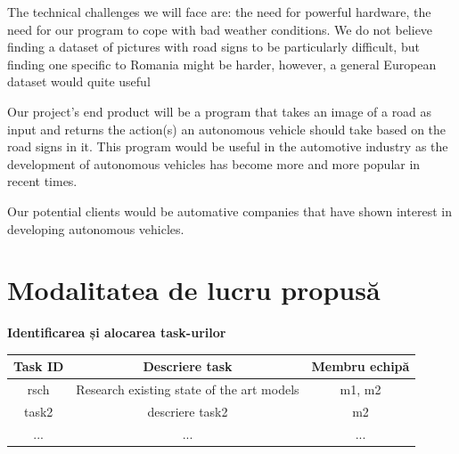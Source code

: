 \documentclass{article}
\begin{document}
The technical challenges we will face are: the need for powerful hardware, the need for our program to cope
with bad weather conditions. We do not believe finding a dataset of pictures with road signs to be particularly
difficult, but finding one specific to Romania might be harder, however, a general European dataset would
quite useful


Our project's end product will be a program that takes an image of a road as input and returns the action(s) an
autonomous vehicle should take based on the road signs in it. This program would be useful in the automotive
industry as the development of autonomous vehicles has become more and more popular in recent times.

Our potential clients would be automative companies that have shown interest in developing autonomous vehicles.

\section{Modalitatea de lucru propusă}




\textbf{Identificarea și alocarea task-urilor}

\begin{center}
\begin{tabular}{ |c|c|c| }
 \hline
 \textbf{Task ID} & \textbf{Descriere task} & \textbf{Membru echipă} \\
  \hline
 rsch & Research existing state of the art models &  m1, m2 \\
  \hline
 task2 & descriere task2 &  m2 \\
 \hline
 ... & ... & ... \\
 \hline
\end{tabular}
\end{center}
\end{document}
